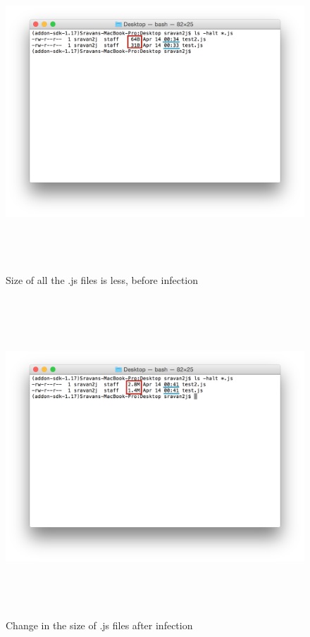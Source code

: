 \begin{figure}
    \centering    
    \includegraphics[width=17cm, height=11.95cm]{beforeinf.png}
    \caption[Sizes of all the .js files before infection, ]{Size of all the .js files is less, before infection}
    \label{fig:beforeinf}
\end{figure}
\begin{figure}
    \centering    
    \includegraphics[width=17cm, height=11.95cm]{afterinf.png}
    \caption[Change in the size of .js files after infection]{Change in the size of .js files after infection}
    \label{fig:afterinf}
\end{figure}

